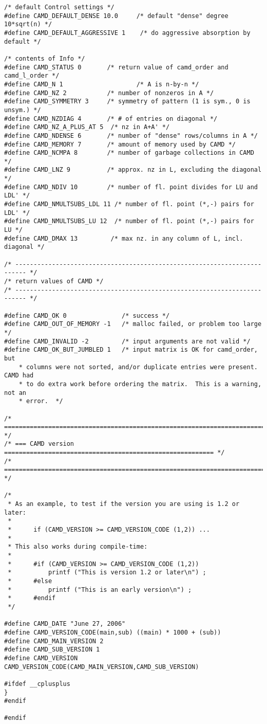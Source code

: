 \documentclass[11pt]{article}
\begin{document}
{\begin{verbatim}
/* default Control settings */
#define CAMD_DEFAULT_DENSE 10.0     /* default "dense" degree 10*sqrt(n) */
#define CAMD_DEFAULT_AGGRESSIVE 1    /* do aggressive absorption by default */

/* contents of Info */
#define CAMD_STATUS 0       /* return value of camd_order and camd_l_order */
#define CAMD_N 1                    /* A is n-by-n */
#define CAMD_NZ 2           /* number of nonzeros in A */ 
#define CAMD_SYMMETRY 3     /* symmetry of pattern (1 is sym., 0 is unsym.) */
#define CAMD_NZDIAG 4       /* # of entries on diagonal */
#define CAMD_NZ_A_PLUS_AT 5  /* nz in A+A' */
#define CAMD_NDENSE 6       /* number of "dense" rows/columns in A */
#define CAMD_MEMORY 7       /* amount of memory used by CAMD */
#define CAMD_NCMPA 8        /* number of garbage collections in CAMD */
#define CAMD_LNZ 9          /* approx. nz in L, excluding the diagonal */
#define CAMD_NDIV 10        /* number of fl. point divides for LU and LDL' */
#define CAMD_NMULTSUBS_LDL 11 /* number of fl. point (*,-) pairs for LDL' */
#define CAMD_NMULTSUBS_LU 12  /* number of fl. point (*,-) pairs for LU */
#define CAMD_DMAX 13         /* max nz. in any column of L, incl. diagonal */

/* ------------------------------------------------------------------------- */
/* return values of CAMD */
/* ------------------------------------------------------------------------- */

#define CAMD_OK 0               /* success */
#define CAMD_OUT_OF_MEMORY -1   /* malloc failed, or problem too large */
#define CAMD_INVALID -2         /* input arguments are not valid */
#define CAMD_OK_BUT_JUMBLED 1   /* input matrix is OK for camd_order, but
    * columns were not sorted, and/or duplicate entries were present.  CAMD had
    * to do extra work before ordering the matrix.  This is a warning, not an
    * error.  */

/* ========================================================================== */
/* === CAMD version ========================================================= */
/* ========================================================================== */

/*
 * As an example, to test if the version you are using is 1.2 or later:
 *
 *      if (CAMD_VERSION >= CAMD_VERSION_CODE (1,2)) ...
 *
 * This also works during compile-time:
 *
 *      #if (CAMD_VERSION >= CAMD_VERSION_CODE (1,2))
 *          printf ("This is version 1.2 or later\n") ;
 *      #else
 *          printf ("This is an early version\n") ;
 *      #endif
 */

#define CAMD_DATE "June 27, 2006"
#define CAMD_VERSION_CODE(main,sub) ((main) * 1000 + (sub))
#define CAMD_MAIN_VERSION 2
#define CAMD_SUB_VERSION 1
#define CAMD_VERSION CAMD_VERSION_CODE(CAMD_MAIN_VERSION,CAMD_SUB_VERSION)

#ifdef __cplusplus
}
#endif

#endif
\end{verbatim}
}

\newpage



\end{document}
